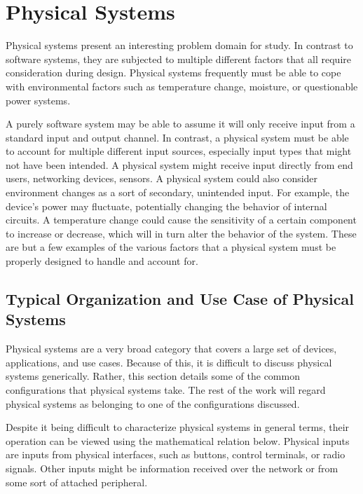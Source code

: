 
\chapter{Physical Systems}
\label{chapter:physicalsystems}

Physical systems present an interesting problem domain for study. In contrast to software systems,
they are subjected to multiple different factors that all require consideration during design. Physical
systems frequently must be able to cope with environmental factors such as temperature change, moisture,
or questionable power systems. 

A purely software system may be able to assume it will only receive input from a standard input and output
channel. In contrast, a physical system must be able
to account for multiple different input sources, especially input types that might not have been intended. 
A physical system might receive input directly from end users, networking devices, sensors. A physical
system could also consider environment changes as a sort of secondary, unintended input. For example,
the device's power may fluctuate, potentially changing the behavior of internal circuits. A temperature change
could cause the sensitivity of a certain component to increase or decrease, which will in turn alter the behavior
of the system. These are but a few examples of the various factors that a physical system must be properly
designed to handle and account for.

\section{Typical Organization and Use Case of Physical Systems}
Physical systems are a very broad category that covers a large set of devices, applications, and use cases.
Because of this, it is difficult to discuss physical systems generically. Rather, this section details some
of the common configurations that physical systems take. The rest of the work will regard physical systems as
belonging to one of the configurations discussed.

Despite it being difficult to characterize physical systems in general terms, their operation can be viewed using the mathematical
relation below. Physical inputs are inputs from physical interfaces, such as buttons, control terminals, or radio signals. Other
inputs might be information received over the network or from some sort of attached peripheral.

